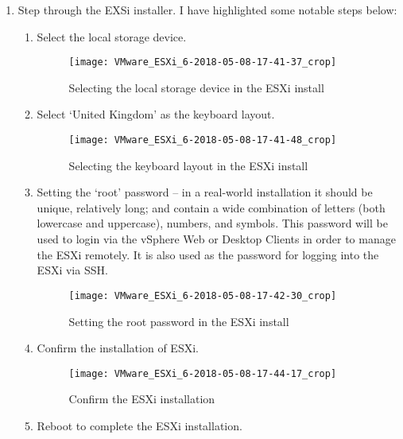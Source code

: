 \begin{enumerate}[resume*=task1methodology]
  \item Step through the EXSi installer. I have highlighted some notable steps below:
    \begin{enumerate}[label=(\alph*)]
      \item Select the local storage device.
        \begin{figure}[H]
          \centering
          \captionsetup{skip=2pt}
          \texttt{[image: VMware\_ESXi\_6-2018-05-08-17-41-37\_crop]}
          \caption{Selecting the local storage device in the ESXi install}
          \label{fig:task1:esxiinstall_01}
        \end{figure}
      \item Select `United Kingdom' as the keyboard layout.
        \begin{figure}[H]
          \centering
          \captionsetup{skip=2pt}
          \texttt{[image: VMware\_ESXi\_6-2018-05-08-17-41-48\_crop]}
          \caption{Selecting the keyboard layout in the ESXi install}
          \label{fig:task1:esxiinstall_02}
        \end{figure}
      \item Setting the `root' password -- in a real-world installation it should be unique, relatively long; and contain a wide combination of letters (both lowercase and uppercase), numbers, and symbols. This password will be used to login via the vSphere Web or Desktop Clients in order to manage the ESXi remotely. It is also used as the password for logging into the ESXi via SSH.
        \begin{figure}[H]
          \centering
          \captionsetup{skip=2pt}
          \texttt{[image: VMware\_ESXi\_6-2018-05-08-17-42-30\_crop]}
          \caption{Setting the root password in the ESXi install}
          \label{fig:task1:esxiinstall_03}
        \end{figure}
      \item Confirm the installation of ESXi.
        \begin{figure}[H]
          \centering
          \captionsetup{skip=2pt}
          \texttt{[image: VMware\_ESXi\_6-2018-05-08-17-44-17\_crop]}
          \caption{Confirm the ESXi installation}
          \label{fig:task1:esxiinstall_04}
        \end{figure}
      \item Reboot to complete the ESXi installation.

\end{enumerate}
\end{enumerate}
